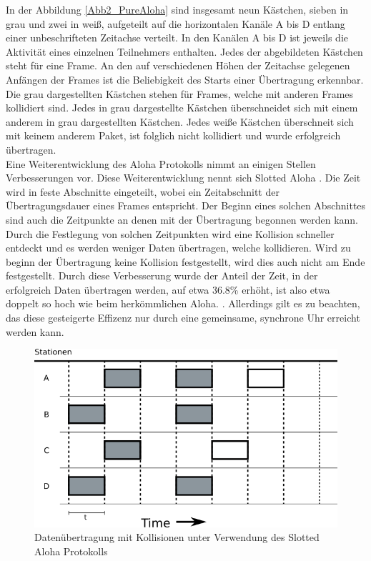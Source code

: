 In der Abbildung \ref{Abb2_PureAloha} sind insgesamt neun Kästchen, sieben in grau und zwei in weiß, aufgeteilt auf die horizontalen Kanäle A bis D entlang einer unbeschrifteten Zeitachse verteilt. In den Kanälen A bis D ist jeweils die Aktivität eines einzelnen Teilnehmers enthalten. Jedes der abgebildeten Kästchen steht für eine Frame. An den auf verschiedenen Höhen der Zeitachse gelegenen Anfängen der Frames ist die Beliebigkeit des Starts einer Übertragung erkennbar. Die grau dargestellten Kästchen stehen für Frames, welche mit anderen Frames kollidiert sind. Jedes in grau dargestellte Kästchen überschneidet sich mit einem anderem in grau dargestellten Kästchen. Jedes weiße Kästchen überschneit sich mit keinem anderem Paket, ist folglich nicht kollidiert und wurde erfolgreich übertragen.\\
Eine Weiterentwicklung des Aloha Protokolls nimmt an einigen Stellen Verbesserungen vor. Diese Weiterentwicklung nennt sich Slotted Aloha \cite{Back_AlohaPure}. Die Zeit wird in feste Abschnitte eingeteilt, wobei ein Zeitabschnitt der Übertragungsdauer eines Frames entspricht. Der Beginn eines solchen Abschnittes sind auch die Zeitpunkte an denen mit der Übertragung begonnen werden kann. Durch die Festlegung von solchen Zeitpunkten wird eine Kollision schneller entdeckt und es werden weniger Daten übertragen, welche kollidieren. Wird zu beginn der Übertragung keine Kollision festgestellt, wird dies auch nicht am Ende festgestellt. Durch diese Verbesserung wurde der Anteil der Zeit, in der erfolgreich Daten übertragen werden, auf etwa 36.8\% erhöht, ist also etwa doppelt so hoch wie beim herkömmlichen Aloha. \cite{Back_AlohaPure}. Allerdings gilt es zu beachten, das diese gesteigerte Effizenz nur durch eine gemeinsame, synchrone Uhr erreicht werden kann.\\
\begin{figure}[h!]
	\begin{center}
	\includegraphics[scale=0.6]{img/ZeichnungExportSlotted3.png}
	\caption{Datenübertragung mit Kollisionen unter Verwendung des Slotted Aloha Protokolls}
	\end{center}
	\label{Abb_SlottedAloha}
\end{figure}
